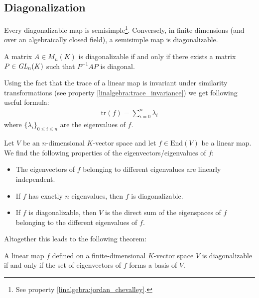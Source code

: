 \subsection{Diagonalization}

    \begin{property}
        Every diagonalizable map is semisimple\footnote{See property \ref{linalgebra:jordan_chevalley}.}. Conversely, in finite dimensions (and over an algebraically closed field), a semisimple map is diagonalizable.
    \end{property}

    \begin{theorem}\label{linalgebra:theorem:diagonalizable_PQP}
        A matrix $A\in M_n(K)$ is diagonalizable if and only if there exists a matrix $P\in\emph{GL}_n(K)$ such that $P^{-1}AP$ is diagonal.
    \end{theorem}
    \begin{result}
        Using the fact that the trace of a linear map is invariant under similarity transformations (see property \ref{linalgebra:trace_invariance}) we get following useful formula:
        \begin{gather}
            \text{tr}(f) = \sum_{i=0}^n\lambda_i
        \end{gather}
        where $\{\lambda_i\}_{0\leq i\leq n}$ are the eigenvalues of $f$.
    \end{result}

    \begin{property}\label{linalgebra:diagonalization_properties}
        Let $V$ be an $n$-dimensional $K$-vector space and let $f\in\text{End}(V)$ be a linear map. We find the following properties of the eigenvectors/eigenvalues of $f$:
        \begin{itemize}
            \item The eigenvectors of $f$ belonging to different eigenvalues are linearly independent.
            \item If $f$ has exactly $n$ eigenvalues, then $f$ is diagonalizable.
            \item If $f$ is diagonalizable, then $V$ is the direct sum of the eigenspaces of $f$ belonging to the different eigenvalues of $f$.
        \end{itemize}
    \end{property}
    Altogether this leads to the following theorem:
    \begin{theorem}\label{linalgebra:theorem:diagonalizable_basis}
        A linear map $f$ defined on a finite-dimensional $K$-vector space $V$ is diagonalizable if and only if the set of eigenvectors of $f$ forms a basis of $V$.
    \end{theorem}

